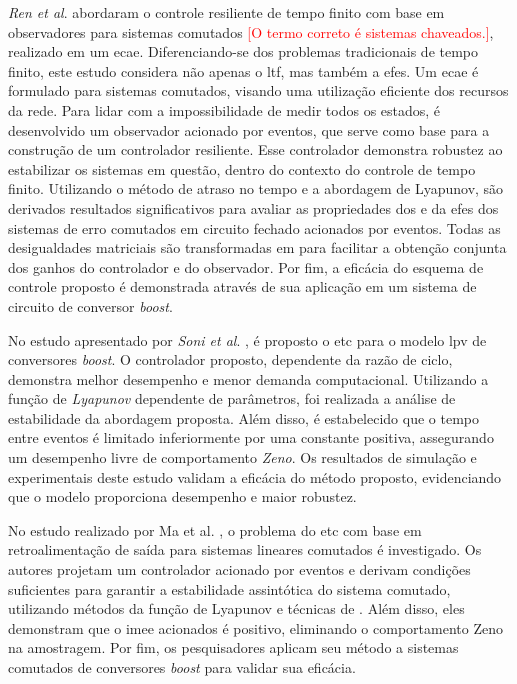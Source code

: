 \textit{Ren et al}. \cite{Ren2018} abordaram o controle resiliente de tempo finito com base em observadores para sistemas comutados \textcolor{red}{[O termo correto é sistemas chaveados.]}, realizado em um \acrfull{ecae}. Diferenciando-se dos problemas tradicionais de tempo finito, este estudo considera não apenas o \acrfull{ltf}, mas também a \acrfull{efes}. Um \acrshort{ecae} é formulado para sistemas comutados, visando uma utilização eficiente dos recursos da rede. Para lidar com a impossibilidade de medir todos os estados, é desenvolvido um observador acionado por eventos, que serve como base para a construção de um controlador resiliente. Esse controlador demonstra robustez ao estabilizar os sistemas em questão, dentro do contexto do controle de tempo finito. Utilizando o método de atraso no tempo e a abordagem de Lyapunov, são derivados resultados significativos para avaliar as propriedades dos  e da \acrshort{efes} dos sistemas de erro comutados em circuito fechado acionados por eventos. Todas as desigualdades matriciais são transformadas em  para facilitar a obtenção conjunta dos ganhos do controlador e do observador. Por fim, a eficácia do esquema de controle proposto é demonstrada através de sua aplicação em um sistema de circuito de conversor \textit{boost}.

No estudo apresentado por \textit{Soni et al}. \cite{Soni2023}, é proposto o \acrshort{etc} para o modelo \acrshort{lpv} de conversores \textit{boost}. O controlador proposto, dependente da razão de ciclo, demonstra melhor desempenho e menor demanda computacional. Utilizando a função de \textit{Lyapunov } dependente de parâmetros, foi realizada a análise de estabilidade da abordagem proposta. Além disso, é estabelecido que o tempo entre eventos é limitado inferiormente por uma constante positiva, assegurando um desempenho livre de comportamento \textit{Zeno}. Os resultados de simulação e experimentais deste estudo validam a eficácia do método proposto, evidenciando que o modelo proporciona desempenho e maior robustez.

No estudo realizado por Ma et al. \cite{Ma2016}, o problema do \acrshort{etc} com base em retroalimentação de saída para sistemas lineares comutados é investigado. Os autores projetam um controlador acionado por eventos e derivam condições suficientes para garantir a estabilidade assintótica do sistema comutado, utilizando métodos da função de Lyapunov e técnicas de . Além disso, eles demonstram que o \acrshort{imee} acionados é positivo, eliminando o comportamento Zeno na amostragem. Por fim, os pesquisadores aplicam seu método a sistemas comutados de conversores \textit{boost} para validar sua eficácia.

